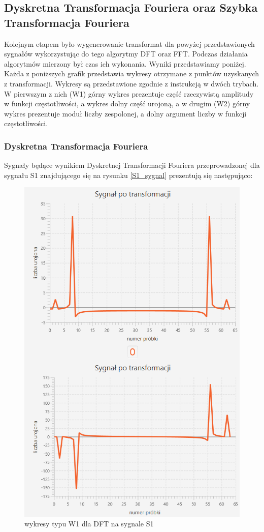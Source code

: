 \documentclass[12pt]{article}
\begin{document}
\subsection{Dyskretna Transformacja Fouriera oraz Szybka Transformacja Fouriera}
Kolejnym etapem było wygenerowanie transformat dla powyżej przedstawionych sygnałów wykorzystując do tego algorytmy DFT oraz FFT. Podczas działania algorytmów mierzony był czas ich wykonania. Wyniki przedstawiamy poniżej. Każda z poniższych grafik przedstawia wykresy otrzymane z punktów uzyskanych z transformacji. Wykresy są przedstawione zgodnie z instrukcją w dwóch trybach. W pierwszym z nich (W1) górny wykres prezentuje część rzeczywistą amplitudy w funkcji częstotliwości, a wykres dolny część urojoną, a w drugim (W2) górny wykres prezentuje moduł liczby zespolonej, a dolny argument liczby w funkcji częstotliwości.

\subsubsection{Dyskretna Transformacja Fouriera}
Sygnały będące wynikiem Dyskretnej Transformacji Fouriera przeprowadzonej dla sygnału S1 znajdującego się na rysunku \ref{S1_sygnal} prezentują się następująco:
\begin{figure}[H]
	\centering
	\includegraphics[width=\linewidth]{S1_DFT_W1.png}
	\caption{wykresy typu W1 dla DFT na sygnale S1}
	\label{S1_DFT_W1}
\end{figure}
\end{document}
